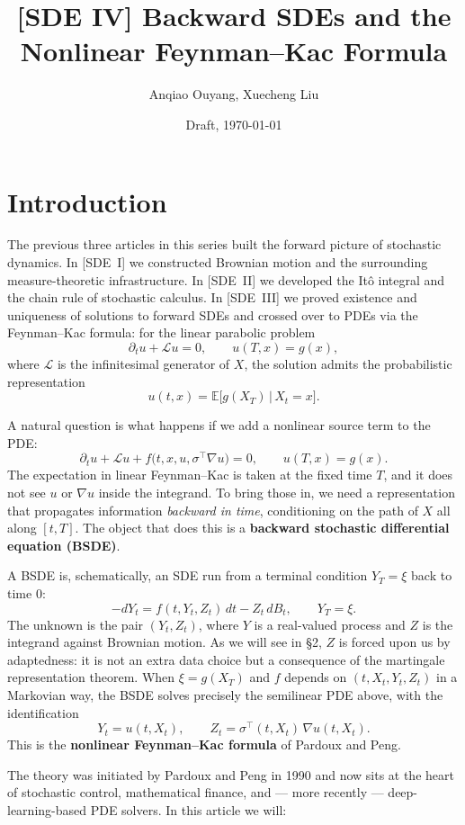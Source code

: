 \documentclass{article}
\title{[SDE IV] Backward SDEs and the Nonlinear Feynman--Kac Formula}
\author{Anqiao Ouyang, Xuecheng Liu}
\date{Draft, \today}
\newcommand{\E}{\mathbb{E}}
\newcommand{\Lc}{\mathcal{L}}
\begin{document}
\maketitle

\section{Introduction}

The previous three articles in this series built the forward picture of stochastic dynamics. In [SDE~I] we constructed Brownian motion and the surrounding measure-theoretic infrastructure. In [SDE~II] we developed the It\^o integral and the chain rule of stochastic calculus. In [SDE~III] we proved existence and uniqueness of solutions to forward SDEs and crossed over to PDEs via the Feynman--Kac formula: for the linear parabolic problem
\[
  \partial_t u + \Lc u = 0, \qquad u(T,x) = g(x),
\]
where $\Lc$ is the infinitesimal generator of $X$, the solution admits the probabilistic representation
\[
  u(t,x) = \E\big[g(X_T) \,\big|\, X_t = x\big].
\]

A natural question is what happens if we add a nonlinear source term to the PDE:
\[
  \partial_t u + \Lc u + f\!\big(t, x, u, \sigma^{\top}\nabla u\big) = 0, \qquad u(T, x) = g(x).
\]
The expectation in linear Feynman--Kac is taken at the fixed time $T$, and it does not see $u$ or $\nabla u$ inside the integrand. To bring those in, we need a representation that propagates information \emph{backward in time}, conditioning on the path of $X$ all along $[t, T]$. The object that does this is a \textbf{backward stochastic differential equation (BSDE)}.

A BSDE is, schematically, an SDE run from a terminal condition $Y_T = \xi$ back to time $0$:
\[
  -dY_t = f(t, Y_t, Z_t)\,dt - Z_t\, dB_t, \qquad Y_T = \xi.
\]
The unknown is the pair $(Y_t, Z_t)$, where $Y$ is a real-valued process and $Z$ is the integrand against Brownian motion. As we will see in \S2, $Z$ is forced upon us by adaptedness: it is not an extra data choice but a consequence of the martingale representation theorem. When $\xi = g(X_T)$ and $f$ depends on $(t, X_t, Y_t, Z_t)$ in a Markovian way, the BSDE solves precisely the semilinear PDE above, with the identification
\[
  Y_t = u(t, X_t), \qquad Z_t = \sigma^{\top}(t, X_t)\, \nabla u(t, X_t).
\]
This is the \textbf{nonlinear Feynman--Kac formula} of Pardoux and Peng.

The theory was initiated by Pardoux and Peng in 1990 and now sits at the heart of stochastic control, mathematical finance, and --- more recently --- deep-learning-based PDE solvers. In this article we will:
\end{document}
